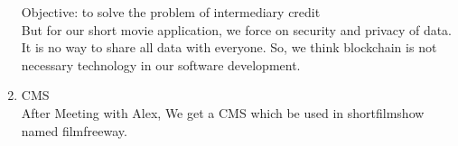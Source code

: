 \documentclass[12pt, letterpaper]{article}
\begin{document}
\begin{enumerate}[1.]
Objective: to solve the problem of intermediary credit\\

But for our short movie application, we force on security and privacy of data. It is no way to share all data with everyone. So, we think blockchain is not necessary technology in our software development.

  \item CMS\\
  After Meeting with Alex, We get a CMS which be used in shortfilmshow named filmfreeway.
\end{enumerate}



\end{document}
